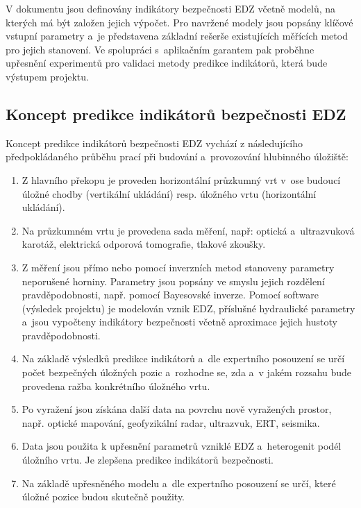\documentclass{article}
\def\todo#1{{TODO:\color{violet}#1}}
\def\jb#1{{\color{violet}#1}}
\newcommand{\pe}[1]{{\color{orange} PE: #1}}
\begin{document}


V dokumentu jsou definovány indikátory bezpečnosti EDZ včetně modelů, na kterých 
má být založen jejich výpočet. Pro navržené modely jsou popsány klíčové vstupní 
parametry a~je představena základní rešerše existujících měřících metod pro jejich
stanovení. Ve spolupráci s~aplikačním garantem pak proběhne upřesnění 
experimentů pro validaci metody predikce indikátorů, která bude výstupem projektu.  



\subsection{Koncept predikce indikátorů bezpečnosti EDZ}



Koncept predikce indikátorů bezpečnosti EDZ vychází z následujícího předpokládaného průběhu prací 
při budování a~provozování hlubinného úložiště:
\begin{enumerate}
    \item Z hlavního překopu je proveden horizontální průzkumný vrt v~ose budoucí úložné chodby
        (vertikální ukládání) resp. úložného vrtu (horizontální ukládání).
    \item Na průzkumném vrtu je provedena sada měření, 
          např: optická a~ultrazvuková karotáž, elektrická odporová tomografie, tlakové zkoušky.

    \item \label{item_model1}
        Z měření jsou přímo nebo pomocí inverzních metod stanoveny parametry neporušené horniny.
        Parametry jsou popsány ve smyslu jejich rozdělení pravděpodobnosti, 
        např. pomocí Bayesovské inverze. Pomocí software (výsledek projektu) je modelován vznik EDZ,
        příslušné hydraulické parametry a~jsou vypočteny indikátory bezpečnosti včetně aproximace 
        jejich hustoty pravděpodobnosti.
    \item Na základě výsledků predikce indikátorů a~dle expertního posouzení se určí počet bezpečných
        úložných pozic a~rozhodne se, zda a~v jakém rozsahu bude provedena ražba  konkrétního úložného vrtu.
    \item Po vyražení jsou získána další data na povrchu nově vyražených prostor, např. optické mapování, 
        geofyzikální radar, ultrazvuk, ERT, seismika. 
    \item Data jsou použita k upřesnění parametrů vzniklé EDZ a~heterogenit podél úložního vrtu. 
        Je zlepšena predikce indikátorů bezpečnosti.  
    \item \label{item_model2}
        Na základě upřesněného modelu a~dle expertního posouzení se určí, které úložné pozice budou 
        skutečně použity.
\end{enumerate}
\end{document}
